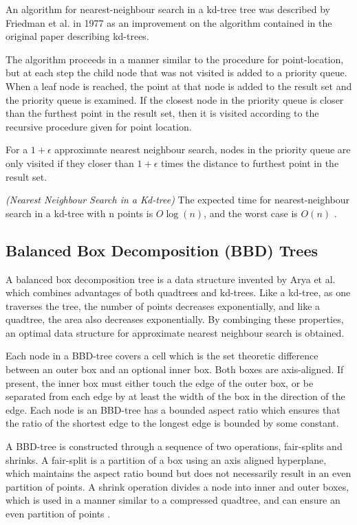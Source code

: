 \documentclass[mcs]{scsthesis}
\begin{document}
An algorithm for nearest-neighbour search in a kd-tree tree was described
by Friedman et al. \cite{friedman} in 1977 as an improvement on the algorithm
contained in the original paper describing kd-trees.

The algorithm proceeds in a manner similar to the procedure for point-location,
but at each step the child node that was not visited is added to a priority
queue. When a leaf node is reached, the point at that node is added to the
result set and the priority queue is examined. If the closest node in the
priority queue is closer than the furthest point in the result set, then it
is visited according to the recursive procedure given for point location. 

For a \(1 + \epsilon\) approximate nearest neighbour search, nodes in the
priority queue are only visited if they closer than \(1 + \epsilon\) times
the distance to furthest point in the result set.

\begin{thm} \emph{(Nearest Neighbour Search in a Kd-tree)} 
The expected time for nearest-neighbour search in a kd-tree with n points is
\(O \log(n)\), and the worst case is \(O(n)\) \cite{friedman}.
\end{thm}

\subsection{Balanced Box Decomposition (BBD) Trees}

A balanced box decomposition tree is a data structure invented by Arya et al.
\cite{optimalann} which combines advantages of both quadtrees and kd-trees.
Like a kd-tree, as one traverses the tree, the number of points decreases
exponentially, and like a quadtree, the area also decreases exponentially. By
combinging these properties, an optimal data structure for approximate nearest
neighbour search is obtained.

Each node in a BBD-tree covers a cell which is the set theoretic difference
between an outer box and an optional inner box. Both boxes are axis-aligned.
If present, the inner box must either touch the edge of the outer box, or be
separated from each edge by at least the width of the box in the direction of
the edge. Each node is an BBD-tree has a bounded aspect ratio which ensures
that the ratio of the shortest edge to the longest edge is bounded by some
constant.

A BBD-tree is constructed through a sequence of two operations, fair-splits
and shrinks. A fair-split is a partition of a box using an axis aligned
hyperplane, which maintains the aspect ratio bound but does not necessarily
result in an even partition of points. A shrink operation divides a node into
inner and outer boxes, which is used in a manner similar to a compressed
quadtree, and can ensure an even partition of points \cite{optimalann}.
\end{document}
